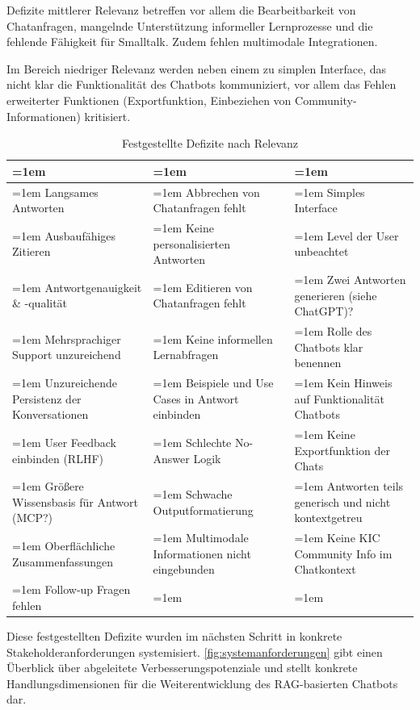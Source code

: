 Defizite mittlerer Relevanz betreffen vor allem die Bearbeitbarkeit von Chatanfragen, mangelnde Unterstützung informeller Lernprozesse und die fehlende Fähigkeit für Smalltalk. Zudem fehlen multimodale Integrationen. 

Im Bereich niedriger Relevanz werden neben einem zu simplen Interface, das nicht klar die Funktionalität des Chatbots kommuniziert, vor allem das Fehlen erweiterter Funktionen (Exportfunktion, Einbeziehen von Community-Informationen) kritisiert.

\begin{table}[H]
\centering
\caption{Festgestellte Defizite nach Relevanz}
\label{tab:usertests}
\begin{tabular}{>{\raggedright\arraybackslash\hangindent=1em\hangafter=1 }p{}>{\raggedright\arraybackslash\hangindent=1em\hangafter=1 }p{}>{\raggedright\arraybackslash\hangindent=1em\hangafter=1 }p{}}
\hline
\multicolumn{1}{l}{\textbf{Hoch}} &
\multicolumn{1}{l}{\textbf{Mittel}} &
\multicolumn{1}{l}{\textbf{Niedrig}} \\
\hline
Langsames Antworten & Abbrechen von  Chatanfragen fehlt & Simples Interface \\
Ausbaufähiges Zitieren & Keine personalisierten Antworten & Level der User unbeachtet \\
Antwortgenauigkeit \& -qualität & Editieren von Chatanfragen fehlt & Zwei Antworten generieren (siehe ChatGPT)? \\
Mehrsprachiger Support unzureichend & Keine informellen Lernabfragen & Rolle des Chatbots klar benennen \\
Unzureichende Persistenz der Konversationen & Beispiele und Use Cases in Antwort einbinden & Kein Hinweis auf Funktionalität Chatbots \\
User Feedback einbinden (RLHF) & Schlechte No-Answer Logik & Keine Exportfunktion der Chats \\
Größere Wissensbasis für Antwort (MCP?) & Schwache Outputformatierung & Antworten teils generisch und nicht kontextgetreu \\
Oberflächliche Zusammenfassungen & Multimodale Informationen nicht eingebunden & Keine KIC Community Info im Chatkontext \\
Follow-up Fragen fehlen &  &  \\
\hline
\end{tabular}
\end{table}
\noindent
Diese festgestellten Defizite wurden im nächsten Schritt in konkrete Stakeholderanforderungen systemisiert. \autoref{fig:systemanforderungen} gibt einen Überblick über abgeleitete Verbesserungspotenziale und stellt konkrete Handlungsdimensionen für die Weiterentwicklung des RAG-basierten Chatbots dar. 

